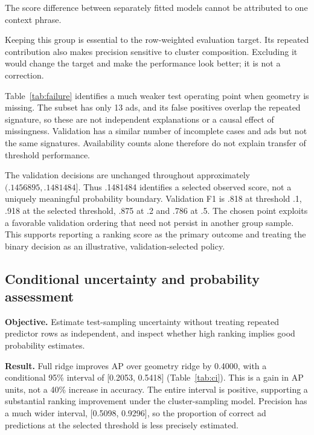 \documentclass[11pt,a4paper]{article}
\begin{document}

The score difference between separately fitted models cannot be attributed to one context phrase.

Keeping this group is essential to the row-weighted evaluation target. Its repeated contribution also makes precision sensitive to cluster composition. Excluding it would change the target and make the performance look better; it is not a correction.
\begin{table}[H]\centering\small
\caption{Frozen-threshold performance by geometry availability; post-hoc descriptive slices.}
\label{tab:failure}
\end{table}
Table~\ref{tab:failure} identifies a much weaker test operating point when geometry is missing. The subset has only 13 ads, and its false positives overlap the repeated signature, so these are not independent explanations or a causal effect of missingness. Validation has a similar number of incomplete cases and ads but not the same signatures. Availability counts alone therefore do not explain transfer of threshold performance.

The validation decisions are unchanged throughout approximately $(.1456895,.1481484]$. Thus .1481484 identifies a selected observed score, not a uniquely meaningful probability boundary. Validation F1 is .818 at threshold .1, .918 at the selected threshold, .875 at .2 and .786 at .5. The chosen point exploits a favorable validation ordering that need not persist in another group sample. This supports reporting a ranking score as the primary outcome and treating the binary decision as an illustrative, validation-selected policy.

\subsection{Conditional uncertainty and probability assessment}
\textbf{Objective.} Estimate test-sampling uncertainty without treating repeated predictor rows as independent, and inspect whether high ranking implies good probability estimates.
\begin{table}[H]\centering
\caption{Cluster-bootstrap percentile intervals for the frozen model and threshold (1,000 resamples).}
\label{tab:ci}
\end{table}
\textbf{Result.} Full ridge improves AP over geometry ridge by 0.4000, with a conditional 95\% interval of [0.2053, 0.5418] (Table~\ref{tab:ci}). This is a gain in AP units, not a 40\% increase in accuracy. The entire interval is positive, supporting a substantial ranking improvement under the cluster-sampling model. Precision has a much wider interval, [0.5098, 0.9296], so the proportion of correct ad predictions at the selected threshold is less precisely estimated.
\end{document}

